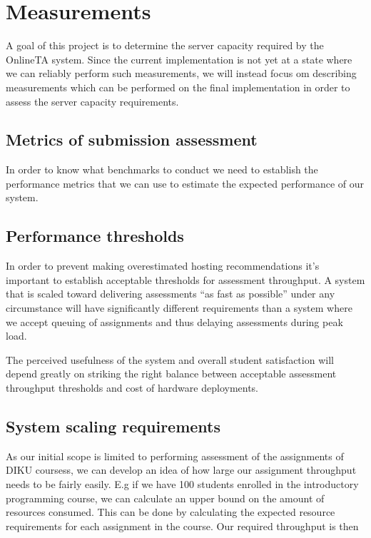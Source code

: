 \chapter{Measurements}
A goal of this project is to determine the server capacity required by
the OnlineTA system. Since the current implementation is not yet at a
state where we can reliably perform such measurements, we will instead
focus om describing measurements which can be performed on the final
implementation in order to assess the server capacity requirements.


\section{Metrics of submission assessment}
In order to know what benchmarks to conduct we need to establish the
performance metrics that we can use to estimate the expected
performance of our system.



\section{Performance thresholds}
In order to prevent making overestimated hosting recommendations it's
important to establish acceptable thresholds for assessment
throughput. A system that is scaled toward delivering assessments "`as
fast as possible"' under any circumstance will have significantly
different requirements than a system where we accept queuing of
assignments and thus delaying assessments during peak load.

The perceived usefulness of the system and overall student
satisfaction will depend greatly on striking the right balance between
acceptable assessment throughput thresholds and cost of hardware
deployments.

\section{System scaling requirements}
As our initial scope is limited to performing assessment of
the assignments of DIKU coursess, we can develop an
idea of how large our assignment throughput needs to be fairly easily. E.g if we
have 100 students enrolled in the introductory programming course, we
can calculate an upper bound on the amount of resources
consumed. This can be done by calculating the expected resource
requirements for each assignment in the course. Our required
throughput is then 

